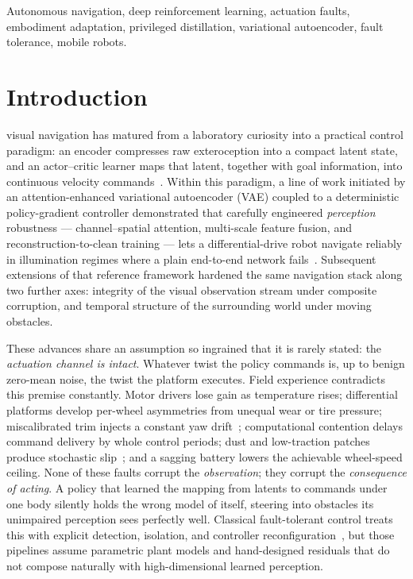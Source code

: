 \documentclass[journal]{IEEEtran}
\begin{document}
\begin{IEEEkeywords}
Autonomous navigation, deep reinforcement learning, actuation faults,
embodiment adaptation, privileged distillation, variational autoencoder,
fault tolerance, mobile robots.
\end{IEEEkeywords}

\IEEEpeerreviewmaketitle

\section{Introduction}
 visual navigation has matured from a laboratory
curiosity into a practical control paradigm: an encoder compresses raw
exteroception into a compact latent state, and an actor--critic learner maps
that latent, together with goal information, into continuous velocity
commands~\cite{Tai2017VirtualToReal,Zhu2021DRLNavSurvey}. Within this
paradigm, a line of work initiated by an attention-enhanced variational
autoencoder (VAE) coupled to a deterministic policy-gradient controller
demonstrated that carefully engineered \emph{perception} robustness ---
channel--spatial attention, multi-scale feature fusion, and
reconstruction-to-clean training --- lets a differential-drive robot navigate
reliably in illumination regimes where a plain end-to-end network
fails~\cite{Lee2026VAEDDPG}. Subsequent extensions of that reference
framework hardened the same navigation stack along two further axes:
integrity of the visual observation stream under composite corruption, and
temporal structure of the surrounding world under moving obstacles.

These advances share an assumption so ingrained that it is rarely stated:
the \emph{actuation channel is intact}. Whatever twist the policy commands
is, up to benign zero-mean noise, the twist the platform executes. Field
experience contradicts this premise constantly. Motor drivers lose gain as
temperature rises; differential platforms develop per-wheel asymmetries from
unequal wear or tire pressure; miscalibrated trim injects a constant yaw
drift~\cite{Borenstein1996UMBmark}; computational contention delays command
delivery by whole control periods; dust and low-traction patches produce
stochastic slip~\cite{Visser2004SlipDetection}; and a sagging battery lowers
the achievable wheel-speed ceiling. None of these faults corrupt the
\emph{observation}; they corrupt the \emph{consequence of acting}. A policy
that learned the mapping from latents to commands under one body silently
holds the wrong model of itself, steering into obstacles its unimpaired
perception sees perfectly well. Classical fault-tolerant control treats this
with explicit detection, isolation, and controller
reconfiguration~\cite{Blanke2006Diagnosis,Zhang2008FTC}, but those pipelines
assume parametric plant models and hand-designed residuals that do not
compose naturally with high-dimensional learned perception.
\end{document}
